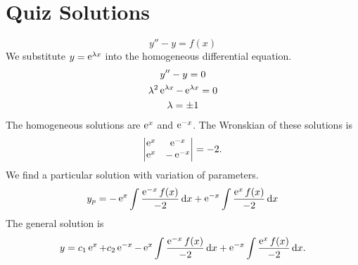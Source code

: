 \raggedbottom
\pagebreak
\flushbottom
\section{Quiz Solutions}


\begin{QuizSolution}
  \label{quiz solution y'' - y = f}
  \[
  y'' - y = f(x)
  \]
  We substitute $y = \e^{\lambda x}$ into the homogeneous differential equation.
  \begin{gather*}
    y'' - y = 0 
    \\
    \lambda^2 \e^{\lambda x} - \e^{\lambda x} = 0 
    \\
    \lambda = \pm 1
  \end{gather*}
  The homogeneous solutions are $\e^{x}$ and $\e^{-x}$.  The Wronskian of 
  these solutions is
  \[
  \begin{vmatrix}
    \e^x & \e^{-x} 
    \\
    \e^x & - \e^{-x}
  \end{vmatrix}
  = - 2.
  \]
  We find a particular solution with variation of parameters.
  \[
  y_p = - \e^x \int \frac{\e^{-x} f(x)}{-2} \,\dd x
  + \e^{-x} \int \frac{\e^x f(x)}{-2} \,\dd x
  \]
  The general solution is
  \[
  y = c_1 \e^x + c_2 \e^{-x}
  - \e^x \int \frac{\e^{-x} f(x)}{-2} \,\dd x
  + \e^{-x} \int \frac{\e^x f(x)}{-2} \,\dd x.
  \]
\end{QuizSolution}







\raggedbottom
